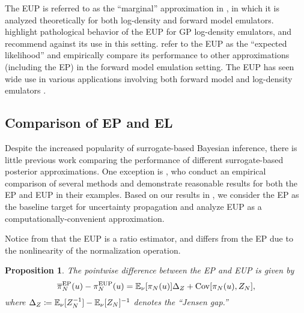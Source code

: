 \documentclass[12pt]{article}
\newtheorem{prop}{Proposition}
\begin{document}
The EUP is referred to as the ``marginal'' approximation in 
\citet{StuartTeck1,StuartTeck2,random_fwd_models,TeckHyperpar},
in which it is analyzed theoretically for both log-density and forward 
model emulators. \citet{VehtariParallelGP} highlight pathological 
behavior of the EUP for GP log-density emulators, and recommend 
against its use in this setting. \citet{BurknerSurrogate} refer to 
the EUP as the ``expected likelihood'' and empirically compare its 
performance to other approximations (including the EP) in the 
forward model emulation setting. The EUP has seen wide 
use in various applications involving both forward model 
and log-density emulators 
\citep{weightedIVAR,GP_PDE_priors,CES,idealizedGCM,
villani2024posteriorsamplingadaptivegaussian,hydrologicalModel,hydrologicalModel2}.

\subsection{Comparison of EP and EL}
Despite the increased popularity of surrogate-based Bayesian inference, there is 
little previous work comparing the performance of different surrogate-based 
posterior approximations. One exception is \citet{BurknerSurrogate}, who conduct an 
empirical comparison of several methods and demonstrate reasonable results for 
both the EP and EUP in their examples. Based on our results in , 
we consider the EP as the baseline target for uncertainty propagation and analyze 
EUP as a computationally-convenient approximation.

Notice from  that the EUP is a ratio estimator, and differs from 
the EP due to the nonlinearity of the normalization operation.

\begin{prop} \label{prop:ep-eup-pw-err}
The pointwise difference between the EP and EUP is given by
\begin{equation}
\overline{\pi}_{N}^{\mathrm{EP}}(u) - \pi_{N}^{\mathrm{EUP}}(u)
= \mathbb{E}_{\nu_{}}[\pi_{N}(u)] \Delta_Z + \mathrm{Cov}[\pi_{N}(u), Z_{N}],
\label{eq:ep-eup-pw-err}
\end{equation}
where $\Delta_Z \coloneqq \mathbb{E}_{\nu_{}}[Z_{N}^{-1}] - \mathbb{E}_{\nu_{}}[Z_{N}]^{-1}$
denotes the ``Jensen gap.''
\end{prop}
\end{document}
